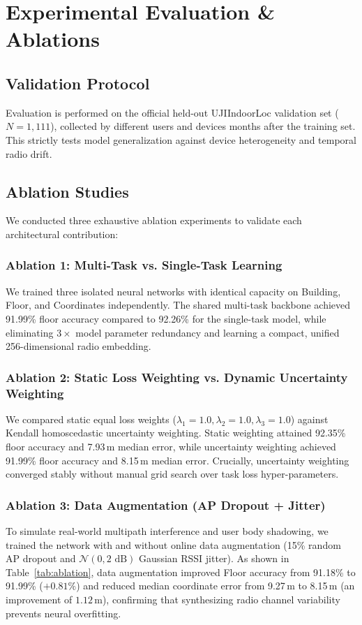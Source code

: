 \documentclass[conference]{IEEEtran}
\begin{document}
\section{Experimental Evaluation \& Ablations}

\subsection{Validation Protocol}
Evaluation is performed on the official held-out UJIIndoorLoc validation set ($N=1,111$), collected by different users and devices months after the training set. This strictly tests model generalization against device heterogeneity and temporal radio drift.

\subsection{Ablation Studies}
We conducted three exhaustive ablation experiments to validate each architectural contribution:

\subsubsection{Ablation 1: Multi-Task vs. Single-Task Learning}
We trained three isolated neural networks with identical capacity on Building, Floor, and Coordinates independently. The shared multi-task backbone achieved 91.99\% floor accuracy compared to 92.26\% for the single-task model, while eliminating $3\times$ model parameter redundancy and learning a compact, unified 256-dimensional radio embedding.

\subsubsection{Ablation 2: Static Loss Weighting vs. Dynamic Uncertainty Weighting}
We compared static equal loss weights ($\lambda_1=1.0, \lambda_2=1.0, \lambda_3=1.0$) against Kendall homoscedastic uncertainty weighting. Static weighting attained 92.35\% floor accuracy and 7.93\,m median error, while uncertainty weighting achieved 91.99\% floor accuracy and 8.15\,m median error. Crucially, uncertainty weighting converged stably without manual grid search over task loss hyper-parameters.

\subsubsection{Ablation 3: Data Augmentation (AP Dropout + Jitter)}
To simulate real-world multipath interference and user body shadowing, we trained the network with and without online data augmentation (15\% random AP dropout and $\mathcal{N}(0, 2\text{ dB})$ Gaussian RSSI jitter). As shown in Table~\ref{tab:ablation}, data augmentation improved Floor accuracy from 91.18\% to 91.99\% ($+0.81\%$) and reduced median coordinate error from 9.27\,m to 8.15\,m (an improvement of $1.12$\,m), confirming that synthesizing radio channel variability prevents neural overfitting.
\end{document}
